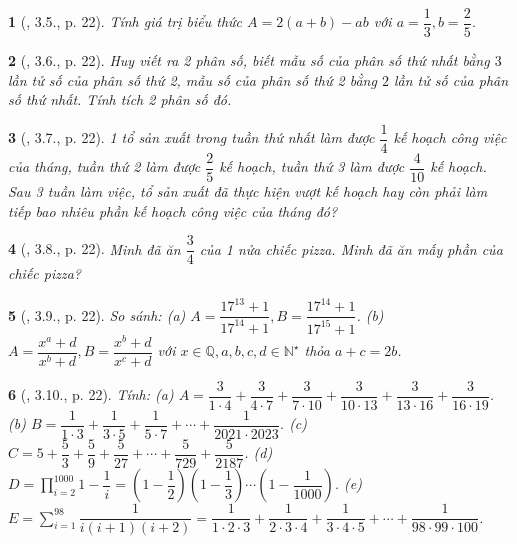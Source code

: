 \documentclass{article}
\newtheorem{baitoan}{}
\begin{document}
\begin{baitoan}[\cite{Binh_boi_duong_Toan_6_tap_2}, 3.5., p. 22]
	Tính giá trị biểu thức $A = 2(a + b) - ab$ với $a = \dfrac{1}{3},b = \dfrac{2}{5}$.
\end{baitoan}

\begin{baitoan}[\cite{Binh_boi_duong_Toan_6_tap_2}, 3.6., p. 22]
	Huy viết ra 2 phân số, biết mẫu số của phân số thứ nhất bằng $3$ lần tử số của phân số thứ 2, mẫu số của phân số thứ 2 bằng $2$ lần tử số của phân số thứ nhất. Tính tích 2 phân số đó.
\end{baitoan}

\begin{baitoan}[\cite{Binh_boi_duong_Toan_6_tap_2}, 3.7., p. 22]
	1 tổ sản xuất trong tuần thứ nhất làm được $\dfrac{1}{4}$ kế hoạch công việc của tháng, tuần thứ 2 làm được $\dfrac{2}{5}$ kế hoạch, tuần thứ 3 làm được $\dfrac{4}{10}$ kế hoạch. Sau 3 tuần làm việc, tổ sản xuất đã thực hiện vượt kế hoạch hay còn phải làm tiếp bao nhiêu phần kế hoạch công việc của tháng đó?
\end{baitoan}

\begin{baitoan}[\cite{Binh_boi_duong_Toan_6_tap_2}, 3.8., p. 22]
	Minh đã ăn $\dfrac{3}{4}$ của 1 nửa chiếc pizza. Minh đã ăn mấy phần của chiếc pizza?
\end{baitoan}

\begin{baitoan}[\cite{Binh_boi_duong_Toan_6_tap_2}, 3.9., p. 22]
	So sánh: (a) $A = \dfrac{17^{13} + 1}{17^{14} + 1},B = \dfrac{17^{14} + 1}{17^{15} + 1}$. (b) $A = \dfrac{x^a + d}{x^b + d},B = \dfrac{x^b + d}{x^c + d}$ với $x\in\mathbb{Q},a,b,c,d\in\mathbb{N}^\star$ thỏa $a + c = 2b$.
\end{baitoan}

\begin{baitoan}[\cite{Binh_boi_duong_Toan_6_tap_2}, 3.10., p. 22]
	Tính: (a) $A = \dfrac{3}{1\cdot4} + \dfrac{3}{4\cdot7} + \dfrac{3}{7\cdot10} + \dfrac{3}{10\cdot13} + \dfrac{3}{13\cdot16} + \dfrac{3}{16\cdot19}$. (b) $B = \dfrac{1}{1\cdot3} + \dfrac{1}{3\cdot5} + \dfrac{1}{5\cdot7} + \cdots + \dfrac{1}{2021\cdot2023}$. (c) $C = 5 + \dfrac{5}{3} + \dfrac{5}{9} + \dfrac{5}{27} + \cdots + \dfrac{5}{729} + \dfrac{5}{2187}$. (d) $D = \prod_{i=2}^{1000} 1 - \dfrac{1}{i} = \left(1 - \dfrac{1}{2}\right)\left(1 - \dfrac{1}{3}\right)\cdots\left(1 - \dfrac{1}{1000}\right)$. (e) $E = \sum_{i=1}^{98} \dfrac{1}{i(i + 1)(i + 2)} = \dfrac{1}{1\cdot2\cdot3} + \dfrac{1}{2\cdot3\cdot4} + \dfrac{1}{3\cdot4\cdot5} + \cdots + \dfrac{1}{98\cdot99\cdot100}$.
\end{baitoan}
\end{document}
